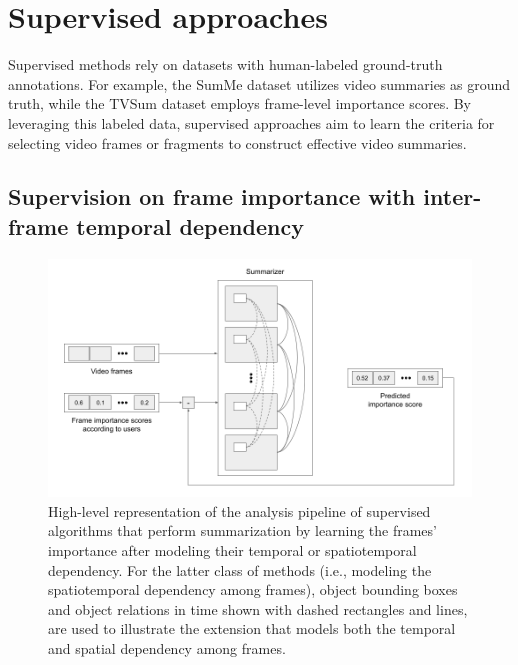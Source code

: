 \label{section:rel-supervised}
\section{Supervised approaches} 
Supervised methods rely on datasets with human-labeled ground-truth annotations. For example, the SumMe dataset \cite{SumMe} utilizes video summaries as ground truth, while the TVSum dataset \cite{TVSum} employs frame-level importance scores. By leveraging this labeled data, supervised approaches aim to learn the criteria for selecting video frames or fragments to construct effective video summaries.

\subsection{Supervision on frame importance with inter-frame temporal dependency}
\label{subsec:rel-sup-temporal-dependency}

\begin{figure}[ht]
  \centering
  \includegraphics[width=0.73\paperwidth]{content/related/figures/sup-model.png}
  \caption{ High-level representation of the analysis pipeline of supervised algorithms that perform summarization by learning the frames' importance after modeling their temporal or spatiotemporal dependency. For the latter class of methods (i.e., modeling the spatiotemporal dependency among frames), object bounding boxes and object relations in time shown with dashed rectangles and lines, are used to illustrate the extension that models both the temporal and spatial dependency among frames.}
  \label{figure:rel-sup-model}
\end{figure}

